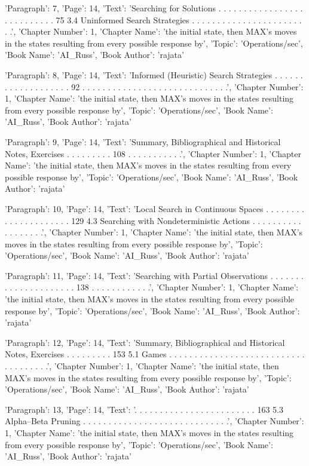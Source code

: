{'Paragraph': 7, 'Page': 14, 'Text': 'Searching for Solutions . . . . . . . . . . . . . . . . . . . . . . . . . . . 75 3.4 Uninformed Search Strategies . . . . . . . . . . . . . . . . . . . . . . . .', 'Chapter Number': 1, 'Chapter Name': 'the initial state, then MAX’s moves in the states resulting from every possible response by', 'Topic': 'Operations/sec', 'Book Name': 'AI_Russ', 'Book Author': 'rajata'}

{'Paragraph': 8, 'Page': 14, 'Text': 'Informed (Heuristic) Search Strategies . . . . . . . . . . . . . . . . . . . 92 . . . . . . . . . . . . . . . . . . . . . . . . . . . . .', 'Chapter Number': 1, 'Chapter Name': 'the initial state, then MAX’s moves in the states resulting from every possible response by', 'Topic': 'Operations/sec', 'Book Name': 'AI_Russ', 'Book Author': 'rajata'}

{'Paragraph': 9, 'Page': 14, 'Text': 'Summary, Bibliographical and Historical Notes, Exercises . . . . . . . . . 108 . . . . . . . . . . .', 'Chapter Number': 1, 'Chapter Name': 'the initial state, then MAX’s moves in the states resulting from every possible response by', 'Topic': 'Operations/sec', 'Book Name': 'AI_Russ', 'Book Author': 'rajata'}

{'Paragraph': 10, 'Page': 14, 'Text': 'Local Search in Continuous Spaces . . . . . . . . . . . . . . . . . . . . . 129 4.3 Searching with Nondeterministic Actions . . . . . . . . . . . . . . . . . .', 'Chapter Number': 1, 'Chapter Name': 'the initial state, then MAX’s moves in the states resulting from every possible response by', 'Topic': 'Operations/sec', 'Book Name': 'AI_Russ', 'Book Author': 'rajata'}

{'Paragraph': 11, 'Page': 14, 'Text': 'Searching with Partial Observations . . . . . . . . . . . . . . . . . . . . . 138 . . . . . . . . . . . .', 'Chapter Number': 1, 'Chapter Name': 'the initial state, then MAX’s moves in the states resulting from every possible response by', 'Topic': 'Operations/sec', 'Book Name': 'AI_Russ', 'Book Author': 'rajata'}

{'Paragraph': 12, 'Page': 14, 'Text': 'Summary, Bibliographical and Historical Notes, Exercises . . . . . . . . . 153 5.1 Games . . . . . . . . . . . . . . . . . . . . . . . . . . . . . . . . . . . .', 'Chapter Number': 1, 'Chapter Name': 'the initial state, then MAX’s moves in the states resulting from every possible response by', 'Topic': 'Operations/sec', 'Book Name': 'AI_Russ', 'Book Author': 'rajata'}

{'Paragraph': 13, 'Page': 14, 'Text': '. . . . . . . . . . . . . . . . . . . . . . . . 163 5.3 Alpha–Beta Pruning . . . . . . . . . . . . . . . . . . . . . . . . . . . . .', 'Chapter Number': 1, 'Chapter Name': 'the initial state, then MAX’s moves in the states resulting from every possible response by', 'Topic': 'Operations/sec', 'Book Name': 'AI_Russ', 'Book Author': 'rajata'}

